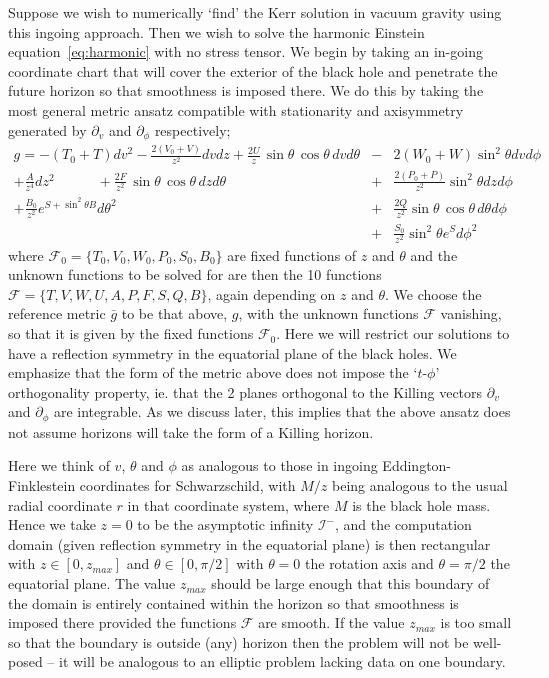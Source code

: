 \documentclass[12pt]{article}
\numberwithin{equation}{section}
\begin{document}
Suppose we wish to numerically `find' the Kerr solution in vacuum gravity using this ingoing approach. Then we wish to solve the harmonic Einstein equation~\eqref{eq:harmonic} with no stress tensor. We begin by taking an in-going coordinate chart that will cover the exterior of the black hole and penetrate the future horizon so that smoothness is imposed there. We do this by taking the most general metric ansatz compatible with stationarity and axisymmetry generated by $\partial_v$ and $\partial_\phi$ respectively; 
\begin{eqnarray}
\label{eq:metricansatz}
g = - \left( T_0 + T \right) dv^2 - \frac{2 \left( V_0 + V \right) }{z^2} dv dz + \frac{2 U}{z}\, \sin\theta\, \cos\theta \, dv d\theta &-&
 2 \left( W_0 + W \right)  \sin^2\theta dv d\phi 
 \nonumber \\
%
 + \frac{A}{z^4} dz^2  \qquad \quad + \frac{2 F}{z^2}\, \sin\theta\, \cos\theta \, dz d\theta
  \; &+&  \frac{2 \left( P_0 + P \right)}{z^2} \sin^2\theta dz d\phi   \nonumber \\
 + \frac{B_0}{z^2} e^{S + \sin^2\theta B} d\theta^2    &+&  \frac{2 Q}{z^2} \sin\theta \,\cos\theta\,  d\theta d\phi   \nonumber \\
 &+& \frac{S_0}{z^2} \sin^2\theta e^{ S  } d\phi^2 
\end{eqnarray}
where $\mathcal{F}_0 = \{T_0, V_0, W_0, P_0, S_0, B_0\}$ are fixed functions of $z$ and $\theta$ and the unknown functions to be solved for are then the 10 functions $\mathcal{F} = \{ T, V, W, U, A, P, F, S, Q, B \}$, again depending on $z$ and $\theta$. 
We choose the reference metric $\bar{g}$ to be that above, $g$, with the unknown functions $\mathcal{F}$ vanishing, so that it is given by the fixed functions $\mathcal{F}_0$.
Here we will restrict our solutions to have a reflection symmetry in the equatorial plane of the black holes. 
We emphasize that the form of the metric above does not impose the `$t$-$\phi$' orthogonality property, ie. that the 2 planes orthogonal to the Killing vectors $\partial_v$ and $\partial_\phi$ are integrable. As we discuss later, this implies that the above ansatz does not assume horizons will take the form of a Killing horizon.


Here we think of $v$, $\theta$ and $\phi$ as analogous to those in ingoing Eddington-Finklestein coordinates for Schwarzschild, with $M/z$ being analogous to the usual radial coordinate $r$ in that coordinate system, where $M$ is the black hole mass. Hence we take $z = 0$ to be the asymptotic infinity $\mathcal{I}^-$, and the computation domain (given reflection symmetry in the equatorial plane) is then rectangular with $z \in [0, z_{max}]$ and $\theta \in [ 0, \pi/2 ]$ with $\theta = 0$ the rotation axis and $\theta = \pi/2$ the equatorial plane. 
The value $z_{max}$ should be large enough that this boundary of the domain is entirely contained within the horizon so that smoothness is imposed there provided the functions $\mathcal{F}$ are smooth. If the value $z_{max}$ is too small so that the boundary is outside (any) horizon then the problem will not be well-posed -- it will be analogous to an elliptic problem lacking data on one boundary. 
\end{document}
